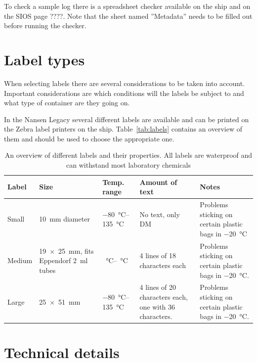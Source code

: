 \documentclass[a4paper,english, 11pt]{article}
\begin{document}
To check a sample log there is a spreadsheet checker available on the ship and on the SIOS page ????.
Note that the sheet named ''Metadata'' needs to be filled out before running the checker.


\section{Label types} %
\label{sub:Labels}

When selecting labels there are several considerations to be taken into account. Important considerations are which conditions will the labels be subject to and what type of container are they going on.

In the Nansen Legacy several different labels are available and can be printed on the Zebra label printers on the ship. Table~\ref{tab:labels} contains an overview of them and should be used to choose the appropriate one.

\begin{table}[htb]
    \caption{\label{tab:lables}An overview of different labels and their properties. All labels are waterproof and can withstand most laboratory chemicals}
    \begin{tabular}{l|P{3cm}lP{4cm}P{4cm}}
        \hline
        \textbf{Label} & \textbf{Size} & \textbf{Temp. range} & \textbf{Amount of text} & \textbf{Notes} \\ \hline
        Small& \SI{10}{\mm} diameter & \SIrange{-80}{135}{\celsius} & No text, only DM & Problems sticking on certain plastic bags in \SI{-20}{\celsius}\\
        Medium& \SI{19 x 25}{\mm}, fits Eppendorf \SI{2}{\ml} tubes & \SIrange{}{}{\celsius} & 4 lines of 18 characters each & Problems sticking on certain plastic bags in \SI{-20}{\celsius}. \\
        Large& \SI{25 x 51}{\mm} & \SIrange{-80}{135}{\celsius} & 4 lines of 20 characters each, one with 36 characters. & Problems sticking on certain plastic bags in  \SI{-20}{\celsius}.\\
        \hline
    \end{tabular}
\end{table}



\appendix

\section{Technical details} %
\label{sec:Technical details}
\end{document}
